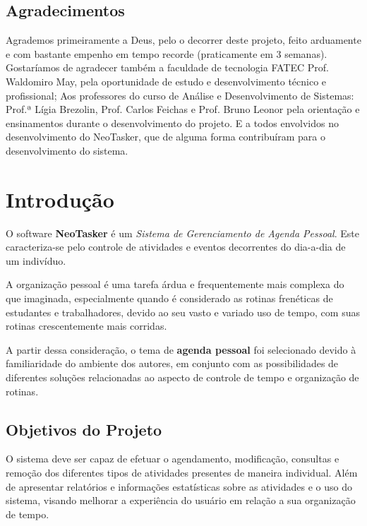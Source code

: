 \documentclass[a4paper,12pt]{article}
\begin{document}
\pagebreak
\begin{center}
\section*{Agradecimentos}
\end{center}
Agrademos primeiramente a Deus, pelo o decorrer deste projeto, feito arduamente e com bastante empenho em tempo recorde (praticamente em 3 semanas). Gostaríamos de 
agradecer também a faculdade de tecnologia FATEC Prof. Waldomiro May, pela oportunidade de estudo e desenvolvimento técnico e profissional; Aos professores do curso de
Análise e Desenvolvimento de Sistemas: Prof.ª Lígia Brezolin, Prof. Carlos Feichas e Prof. Bruno Leonor pela orientação e ensinamentos durante o desenvolvimento do projeto.
E a todos envolvidos no desenvolvimento do NeoTasker, que de alguma forma contribuíram para o desenvolvimento do sistema.
\pagebreak

\listoffigures
\pagebreak


\setcounter{tocdepth}{4}
\tableofcontents
\pagebreak

\pagebreak
\section{Introdução}
O software \textbf{NeoTasker} é um \textit{Sistema de Gerenciamento de Agenda Pessoal}. Este caracteriza-se pelo controle de atividades 
e eventos decorrentes do dia-a-dia de um indivíduo.

A organização pessoal é uma tarefa árdua e frequentemente mais complexa do que imaginada, especialmente quando é considerado as rotinas 
frenéticas de estudantes e trabalhadores, devido ao seu vasto e variado uso de tempo, com suas rotinas crescentemente mais corridas.

A partir dessa consideração, o tema de \textbf{agenda pessoal} foi selecionado devido à familiaridade do ambiente dos autores, em 
conjunto com as possibilidades de diferentes soluções relacionadas ao aspecto de controle de tempo e organização de rotinas.

\subsection{Objetivos do Projeto}
O sistema deve ser capaz de efetuar o agendamento, modificação, consultas e remoção dos diferentes tipos de atividades presentes 
de maneira individual. Além de apresentar relatórios e informações estatísticas sobre as atividades e o uso do sistema, visando 
melhorar a experiência do usuário em relação a sua organização de tempo.
\end{document}
